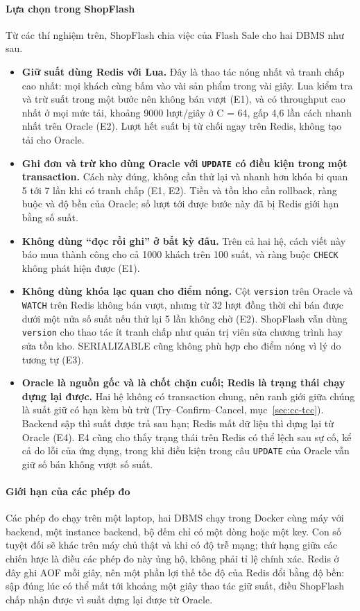 \paragraph{Lựa chọn trong ShopFlash}\label{sec:cc-ket-luan}
Từ các thí nghiệm trên, ShopFlash chia việc của Flash Sale cho hai DBMS như sau.

\begin{itemize}
  \item \textbf{Giữ suất dùng Redis với Lua.} Đây là thao tác nóng nhất và tranh chấp cao nhất: mọi khách cùng bấm vào vài sản phẩm trong vài giây. Lua kiểm tra và trừ suất trong một bước nên không bán vượt (E1), và có throughput cao nhất ở mọi mức tải, khoảng 9000 lượt/giây ở C = 64, gấp 4,6 lần cách nhanh nhất trên Oracle (E2). Lượt hết suất bị từ chối ngay trên Redis, không tạo tải cho Oracle.
  \item \textbf{Ghi đơn và trừ kho dùng Oracle với \texttt{UPDATE} có điều kiện trong một transaction.} Cách này đúng, không cần thử lại và nhanh hơn khóa bi quan 5 tới 7 lần khi có tranh chấp (E1, E2). Tiền và tồn kho cần rollback, ràng buộc và độ bền của Oracle; số lượt tới được bước này đã bị Redis giới hạn bằng số suất.
  \item \textbf{Không dùng ``đọc rồi ghi'' ở bất kỳ đâu.} Trên cả hai hệ, cách viết này báo mua thành công cho cả 1000 khách trên 100 suất, và ràng buộc \texttt{CHECK} không phát hiện được (E1).
  \item \textbf{Không dùng khóa lạc quan cho điểm nóng.} Cột \texttt{version} trên Oracle và \texttt{WATCH} trên Redis không bán vượt, nhưng từ 32 lượt đồng thời chỉ bán được dưới một nửa số suất nếu thử lại 5 lần không chờ (E2). ShopFlash vẫn dùng \texttt{version} cho thao tác ít tranh chấp như quản trị viên sửa chương trình hay sửa tồn kho. SERIALIZABLE cũng không phù hợp cho điểm nóng vì lý do tương tự (E3).
  \item \textbf{Oracle là nguồn gốc và là chốt chặn cuối; Redis là trạng thái chạy dựng lại được.} Hai hệ không có transaction chung, nên ranh giới giữa chúng là suất giữ có hạn kèm bù trừ (Try--Confirm--Cancel, mục~\ref{sec:cc-tcc}). Backend sập thì suất được trả sau hạn; Redis mất dữ liệu thì dựng lại từ Oracle (E4). E4 cũng cho thấy trạng thái trên Redis có thể lệch sau sự cố, kể cả do lỗi của ứng dụng, trong khi điều kiện trong câu \texttt{UPDATE} của Oracle vẫn giữ số bán không vượt số suất.
\end{itemize}

\paragraph{Giới hạn của các phép đo}
Các phép đo chạy trên một laptop, hai DBMS chạy trong Docker cùng máy với backend, một instance backend, bộ đếm chỉ có một dòng hoặc một key. Con số tuyệt đối sẽ khác trên máy chủ thật và khi có độ trễ mạng; thứ hạng giữa các chiến lược là điều các phép đo này ủng hộ, không phải tỉ lệ chính xác. Redis ở đây ghi AOF mỗi giây, nên một phần lợi thế tốc độ của Redis đổi bằng độ bền: sập đúng lúc có thể mất tới khoảng một giây thao tác giữ suất, điều ShopFlash chấp nhận được vì suất dựng lại được từ Oracle.
